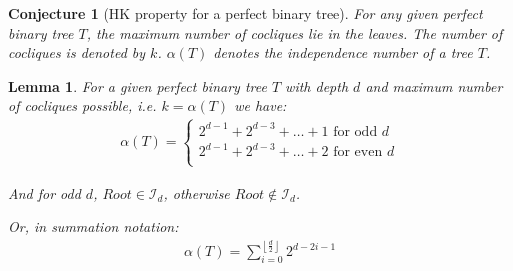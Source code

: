 \documentclass{amsart}
\newtheorem{lemma}[theorem]{Lemma}
\newtheorem{conjecture}[theorem]{Conjecture}
\theoremstyle{definition}
\begin{document}
\begin{conjecture}[HK property for a perfect binary tree]
	For any given perfect binary tree $T$, the maximum number of cocliques lie in the leaves. The number of cocliques is denoted by $k$. $\alpha(T)$ denotes the independence number of a tree $T$.
\end{conjecture}

\begin{lemma}\label{independence_num}
	For a given perfect binary tree $T$ with depth $d$ and maximum number of cocliques possible, i.e. $k = \alpha(T)$ we have:
	\begin{align*}
		\alpha(T) = \begin{cases}
			            2^{d - 1} + 2^{d-3} + \ldots + 1 \text{ for odd $d$}  \\
			            2^{d - 1} + 2^{d-3} + \ldots + 2 \text{ for even $d$} \\
		            \end{cases}
	\end{align*}

	And for odd $d$, $Root \in \mathcal{I}_d$, otherwise $Root \not\in \mathcal{I}_d$.

	Or, in summation notation:
	\begin{align*}
		\alpha(T) = \sum_{i= 0}^{\left\lfloor\frac{d}{2}\right\rfloor} 2^{d - 2i - 1}
	\end{align*}
\end{lemma}
\end{document}
